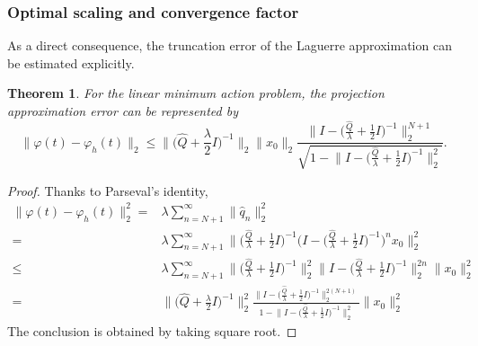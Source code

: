 \documentclass[a4paper,fleqn, 12pt]{cas-sc}
\newtheorem{theorem}{Theorem}
\numberwithin{table}{section}
\begin{document}
\subsubsection{Optimal scaling and convergence factor}

As a direct consequence, the truncation error of the Laguerre approximation can be estimated
explicitly.


\begin{theorem}
	For the linear minimum action problem, the projection approximation error
	can be represented by
    \begin{equation}\label{eq:linear_error}
       \| \varphi (t) - \varphi_h  (t) \|_2 \leqslant \bigl\| \bigl( \hat{Q} +
	\frac{\lambda}{2} I \bigr)^{- 1} \bigr\|_2  \| x_0 \|_2 
    \frac{\bigl\| I - \bigl( \frac{\hat{Q}}{\lambda} + \frac{1}{2} I \bigr)^{-1}
		 \bigr\|^{N + 1}_2}
         {\sqrt{1 - \bigl\| I - \bigl( \frac{\hat{Q}}{\lambda}
			+ \frac{1}{2} I \bigr)^{- 1} \bigr\|^2_2}}. 
    \end{equation}
\end{theorem}

\begin{proof}
	Thanks to Parseval's identity,
	\begin{align*}
		\| \varphi (t) - \varphi_h  (t) \|^2_2 = & \lambda \sum_{n = N +
			1}^{\infty} \| \widehat{q }_n \|_2^2 & \\
		= & \lambda \sum_{n = N + 1}^{\infty} \bigl\| \bigl(
		\frac{\hat{Q}}{\lambda} + \frac{1}{2} I \bigr)^{- 1} \bigl( I - \bigl(
		\frac{\hat{Q}}{\lambda} + \frac{1}{2} I \bigr)^{- 1} \bigr)^n x_0
		 \bigr\|_2^2 & \\
		\leqslant & \lambda \sum_{n = N + 1}^{\infty} \bigl\| \bigl(
		\frac{\hat{Q}}{\lambda} + \frac{1}{2} I \bigr)^{- 1} \bigr\|^2_2 \bigl\|
		I - \bigl( \frac{\hat{Q}}{\lambda} + \frac{1}{2} I \bigr)^{- 1}
		 \bigr\|^{2 n}_2 \| x_0 \|^2_2 & \\
		= & \bigl\| \bigl( \hat{Q} + \frac{\lambda}{2} I \bigr)^{- 1}
		 \bigr\|^2_2  \frac{\bigl\| I - \bigl( \frac{\hat{Q}}{\lambda} +
			\frac{1}{2} I \bigr)^{- 1} \bigr\|^{2 (N + 1)}_2}{1 - \bigl\| I - \bigl(
			\frac{\hat{Q}}{\lambda} + \frac{1}{2} I \bigr)^{- 1} \bigr\|^2_2} \| x_0
		\|^2_2 &
	\end{align*}
	The conclusion is obtained by taking square root.
\end{proof}
\end{document}
